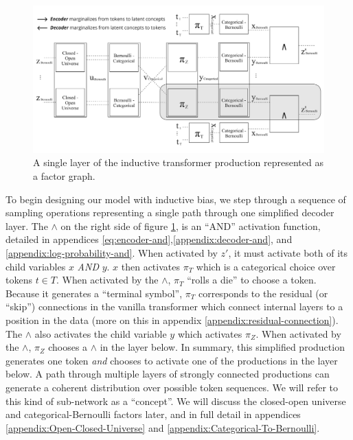 \documentclass{article}
\begin{document}
\begin{figure}[H]
    \includegraphics[width=\textwidth]{figures/transformer_factor_graph.pdf}
    \caption{A single layer of the inductive transformer production represented as a factor graph.}
    \label{fig:factor-graph-for-inductive-transformer}
\end{figure}

To begin designing our model with inductive bias, we step through a sequence of sampling operations representing a single path through one simplified decoder layer.  The $\land$ on the right side of figure \ref{fig:factor-graph-for-inductive-transformer}, is an ``AND'' activation function, detailed in appendices \ref{eq:encoder-and},\ref{appendix:decoder-and}, and \ref{appendix:log-probability-and}. When activated by $z'$, it must activate both of its child variables $x$ \emph{AND} $y$. $x$ then activates $\pi_T$ which is a categorical choice over tokens $t \in T$. When activated by the $\land$, $\pi_T$ ``rolls a die'' to choose a token.  Because it generates a ``terminal symbol'', $\pi_T$ corresponds to the residual (or ``skip'') connections in the vanilla transformer which connect internal layers to a position in the data (more on this in appendix \ref{appendix:residual-connection}). The $\land$ also activates the child variable $y$ which activates $\pi_Z$. When activated by the $\land$, $\pi_Z$ chooses a $\land$ in the layer below.  In summary, this simplified production generates one token \emph{and} chooses to activate one of the productions in the layer below.  A path through multiple layers of strongly connected productions can generate a coherent distribution over possible token sequences.  We will refer to this kind of sub-network as a ``concept''.  We will discuss the closed-open universe and categorical-Bernoulli factors later, and in full detail in appendices \ref{appendix:Open-Closed-Universe} and \ref{appendix:Categorical-To-Bernoulli}.
\end{document}
